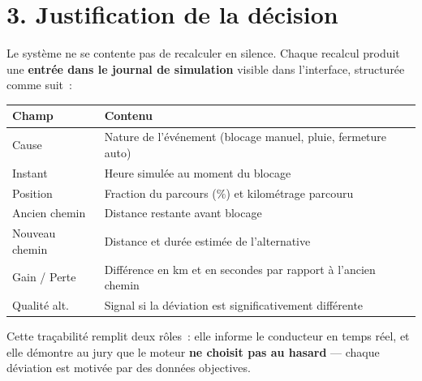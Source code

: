 \documentclass[12pt,a4paper]{article}
\begin{document}
\bigskip

\section*{3. Justification de la d\'ecision}

Le syst\`eme ne se contente pas de recalculer en silence.
Chaque recalcul produit une \textbf{entr\'ee dans le journal de simulation}
visible dans l'interface, structur\'ee comme suit~:

\begin{center}
\begin{tabular}{lp{9cm}}
\toprule
\textbf{Champ} & \textbf{Contenu} \\
\midrule
Cause          & Nature de l'\'ev\'enement (blocage manuel, pluie, fermeture auto) \\
Instant        & Heure simul\'ee au moment du blocage \\
Position       & Fraction du parcours ($\%$) et kilom\'etrage parcouru \\
Ancien chemin  & Distance restante avant blocage \\
Nouveau chemin & Distance et dur\'ee estim\'ee de l'alternative \\
Gain / Perte   & Diff\'erence en km et en secondes par rapport \`a l'ancien chemin \\
Qualit\'e alt. & Signal si la d\'eviation est significativement diff\'erente \\
\bottomrule
\end{tabular}
\end{center}

\medskip
\noindent
Cette tra\c{c}abilit\'e remplit deux r\^oles~: elle informe le conducteur
en temps r\'eel, et elle d\'emontre au jury que le moteur \textbf{ne choisit
pas au hasard} --- chaque d\'eviation est motiv\'ee par des donn\'ees objectives.

\bigskip
\end{document}
